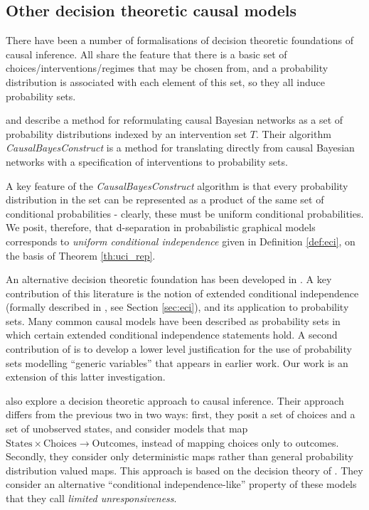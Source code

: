 \subsection{Other decision theoretic causal models}

There have been a number of formalisations of decision theoretic foundations of causal inference. All share the feature that there is a basic set of choices/interventions/regimes that may be chosen from, and a probability distribution is associated with each element of this set, so they all induce probability sets. 

\citet{lattimore_causal_2019} and \citet{lattimore_replacing_2019} describe a method for reformulating causal Bayesian networks as a set of probability distributions indexed by an intervention set $T$. Their algorithm \emph{CausalBayesConstruct} is a method for translating directly from causal Bayesian networks with a specification of interventions to probability sets.

A key feature of the \emph{CausalBayesConstruct} algorithm is that every probability distribution in the set can be represented as a product of the same set of conditional probabilities - clearly, these must be uniform conditional probabilities. We posit, therefore, that d-separation in probabilistic graphical models corresponds to \emph{uniform conditional independence} given in Definition \ref{def:eci}, on the basis of Theorem \ref{th:uci_rep}.

An alternative decision theoretic foundation has been developed in \citet{dawid_decision-theoretic_2020,dawid_beware_2010,dawid_causal_2000}. A key contribution of this literature is the notion of extended conditional independence (formally described in \citet{constantinou_extended_2017}, see Section \ref{sec:eci}), and its application to probability sets. Many common causal models have been described as probability sets in which certain extended conditional independence statements hold. A second contribution of \citet{dawid_decision-theoretic_2020} is to develop a lower level justification for the use of probability sets modelling ``generic variables'' that appears in earlier work. Our work is an extension of this latter investigation.

\citet{heckerman_decision-theoretic_1995} also explore a decision theoretic approach to causal inference. Their approach differs from the previous two in two ways: first, they posit a set of choices and a set of unobserved states, and consider models that map $\mathrm{States}\times\mathrm{Choices}\to \mathrm{Outcomes}$, instead of mapping choices only to outcomes. Secondly, they consider only deterministic maps rather than general probability distribution valued maps. This approach is based on the decision theory of \citet{savage_foundations_1954}. They consider an alternative ``conditional independence-like'' property of these models that they call \emph{limited unresponsiveness}.